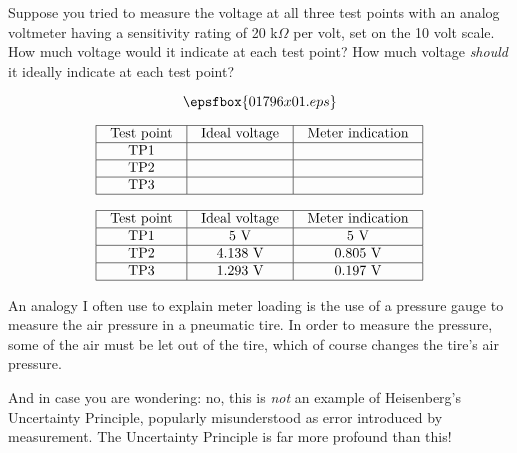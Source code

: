 

Suppose you tried to measure the voltage at all three test points with an analog voltmeter having a sensitivity rating of 20 k$\Omega$ per volt, set on the 10 volt scale.  How much voltage would it indicate at each test point?  How much voltage {\it should} it ideally indicate at each test point?

$$\epsfbox{01796x01.eps}$$


$$\vbox{\offinterlineskip
\halign{\strut
\vrule \quad\hfil # \ \hfil & 
\vrule \quad\hfil # \ \hfil & 
\vrule \quad\hfil # \ \hfil \vrule \cr
\noalign{\hrule}
%
Test point & Ideal voltage & Meter indication \cr
%
\noalign{\hrule}
%
TP1 &  &  \cr
%
\noalign{\hrule}
%
TP2 &  &  \cr
%
\noalign{\hrule}
%
TP3 &  &  \cr
%
\noalign{\hrule}
} %
}$$ %








$$\vbox{\offinterlineskip
\halign{\strut
\vrule \quad\hfil # \ \hfil & 
\vrule \quad\hfil # \ \hfil & 
\vrule \quad\hfil # \ \hfil \vrule \cr
\noalign{\hrule}
%
Test point & Ideal voltage & Meter indication \cr
%
\noalign{\hrule}
%
TP1 & 5 V & 5 V \cr
%
\noalign{\hrule}
%
TP2 & 4.138 V & 0.805 V \cr
%
\noalign{\hrule}
%
TP3 & 1.293 V & 0.197 V \cr
%
\noalign{\hrule}
} %
}$$ %







An analogy I often use to explain meter loading is the use of a pressure gauge to measure the air pressure in a pneumatic tire.  In order to measure the pressure, some of the air must be let out of the tire, which of course changes the tire's air pressure.

And in case you are wondering: no, this is {\it not} an example of Heisenberg's Uncertainty Principle, popularly misunderstood as error introduced by measurement.  The Uncertainty Principle is far more profound than this!




